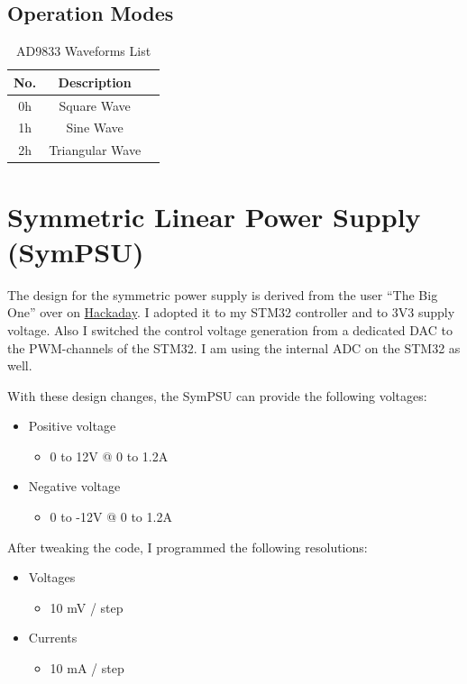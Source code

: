 \subsection{Operation Modes}
\begin{table}[H]
    \centering
    \begin{tabular}{|c|c|l|}
        \hline
        \textbf{No.}   & \multicolumn{1}{|c|}{\textbf{Description}}\\ \hline \hline
        0h   &  Square Wave\\ \hline
		1h   &  Sine Wave\\ \hline
		2h	 &  Triangular Wave \\ \hline
    \end{tabular}
	\caption{AD9833 Waveforms List}
\label{tab:mode-Waveform9833}
\end{table}

\section{Symmetric Linear Power Supply (SymPSU)}
The design for the symmetric power supply is derived from the user ``The Big One'' over on \textcolor{blue}{\href{https://hackaday.io/project/4154-bench-power-supply}{Hackaday}}. I adopted it to my STM32 controller and to 3V3 supply voltage. Also I switched the control voltage generation from a dedicated DAC to the PWM-channels of the STM32. I am using the internal ADC on the STM32 as well. 

With these design changes, the SymPSU can provide the following voltages:
\begin{itemize}
	\item Positive voltage
	\begin{itemize}
		\item 0 to 12V @ 0 to 1.2A
	\end{itemize}
	\item Negative voltage
	\begin{itemize}
		\item 0 to -12V @ 0 to 1.2A
	\end{itemize}
\end{itemize}

After tweaking the code, I programmed the following resolutions:

\begin{itemize}
	\item Voltages
	\begin{itemize}
		\item 10 mV / step
	\end{itemize}
	\item Currents
	\begin{itemize}
		\item 10 mA / step
	\end{itemize}
\end{itemize}

